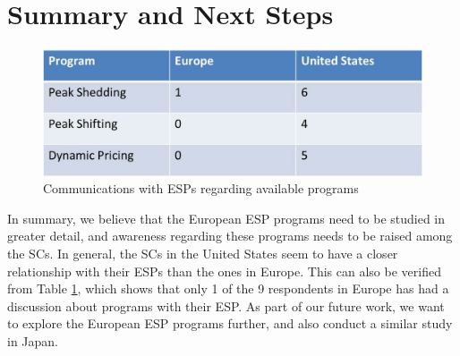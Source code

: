 \section{Summary and Next Steps}
\label{summary}

\begin{figure}
\begin{center}
\includegraphics[scale=0.5]{figs/Table3.jpg}
\caption{Communications with ESPs regarding available programs}
\label{fig:table3}
\end{center}
\end{figure}

In summary, we believe that the European ESP programs need to be studied in greater detail, and awareness regarding these programs needs to be raised among the SCs. In general, the SCs in the United States seem to have a closer relationship with their ESPs than the ones in Europe. This can also be verified from Table \ref{fig:table3}, which shows that only 1 of the 9 respondents in Europe has had a discussion about programs with their ESP. As part of our future work, we want to explore the European ESP programs further, and also conduct a similar study in Japan.